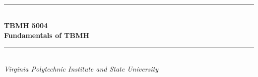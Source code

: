 \documentclass[11pt, final]{article}
\begin{document}
	
	\newcommand{\HRule}{\rule{\linewidth}{0.5mm}}


	\begin{titlepage}
		{~ \\[5cm] }
		
		\noindent \HRule \\[0.4cm]
		{ \Huge \bfseries TBMH 5004 \\[0.4cm] }
		{ \huge \bfseries Fundamentals of TBMH \\ }
		\HRule \\[0.4cm]
		
		{ \large \emph{Virginia Polytechnic Institute and State University} }
	\end{titlepage}


	\tableofcontents


	
	
	

	\nocite{*}
	
	

	\printindex
\end{document}
